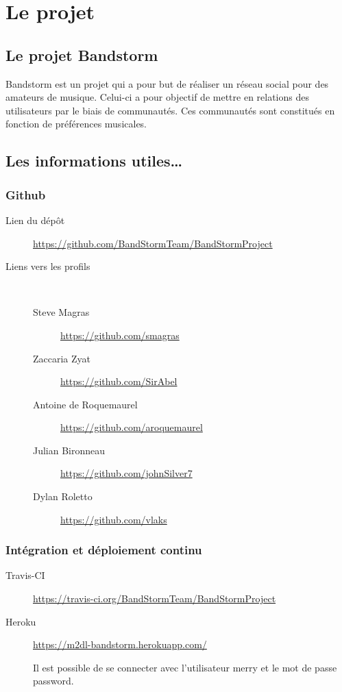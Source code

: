 \documentclass[12pt,a4paper,oneside]{book}
\begin{document}
	\thispagestyle{empty} %
	\titleBC

	\setcounter{tocdepth}{1}
	\setcounter{secnumdepth}{3}
	\setcounter{minitocdepth}{1}
	
	\tableofcontents
	\chapter{Le projet}
	\section{Le projet Bandstorm}
	Bandstorm est un projet qui a pour but de réaliser un réseau social pour des amateurs de musique. Celui-ci a pour objectif de mettre en relations des utilisateurs par le biais de communautés. Ces communautés sont constitués en fonction de préférences musicales.

	\section{Les informations utiles\ldots}
	\subsection{Github}
	\begin{description}
		\item[Lien du dépôt] \url{https://github.com/BandStormTeam/BandStormProject}~\\
		\item[Liens vers les profils]~
			\begin{description}
				\item[Steve Magras] \url{https://github.com/smagras}
				\item[Zaccaria Zyat] \url{https://github.com/SirAbel}
				\item[Antoine de Roquemaurel] \url{https://github.com/aroquemaurel}
				\item[Julian Bironneau] \url{https://github.com/johnSilver7}
				\item[Dylan Roletto] \url{https://github.com/vlaks} 
			\end{description}
	\end{description}

	\subsection{Intégration et déploiement continu}
	\begin{description}
		\item[Travis-CI] \url{https://travis-ci.org/BandStormTeam/BandStormProject }
		\item[Heroku] \url{https://m2dl-bandstorm.herokuapp.com/}~\\
			\begin{exemple}
				Il est possible de se connecter avec l'utilisateur merry et le mot de passe password.
			\end{exemple}
	\end{description}
\end{document}
